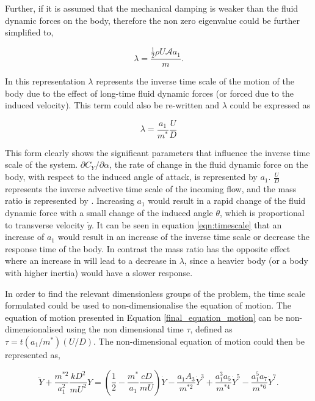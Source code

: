   Further, if it is assumed that the mechanical damping is weaker than the fluid dynamic forces on the body, therefore the non zero eigenvalue could be further simplified to,
  
 \begin{equation}
 \label{eqn:eigs_nospring_nodamp}
 \lambda=\frac{\frac{1}{2}\rho U\mathcal{A}a_1}{m}.
 \end{equation}  

In this representation $\lambda$ represents the inverse time scale of the motion of the body due to the effect of long-time fluid dynamic forces (or forced due to the induced velocity). This term could also be re-written and $\lambda$ could be expressed as 

\begin{equation}
\label{eqn:timescale}
\lambda = \frac{a_1}{m^*}\frac{U}{D}
\end{equation}

This form clearly shows the significant parameters that influence the inverse time scale of the system. $\partial C_Y / \partial \alpha $, the rate of change in the fluid dynamic force on the body, with respect to the induced angle of attack, is represented by $a_1$. $\frac{U}{D}$ represents the inverse advective time scale of the incoming flow, and the mass ratio is represented by \mstar. Increasing $a_1$ would result in a rapid change of the fluid dynamic force with a small change of the induced angle $\theta$, which is proportional to transverse velocity $\dot{y}$. It can be seen in equation \ref{eqn:timescale} that an increase of $a_{1}$ would result in an increase of the inverse time scale or decrease the response time of the body. In contrast the mass ratio has the opposite effect where an increase in \mstar will lead to a decrease in $\lambda$, since a heavier body (or a body with higher inertia) would have a slower response. 

In order to find the relevant dimensionless groups of the problem, the time scale formulated could be used to non-dimensionalise the equation of motion. The equation of motion presented in Equation \ref{final_equation_motion} can be non-dimensionalised using the non dimensional time $\tau$, defined as $\tau=t(a_1/m^*)(U/D)$. The non-dimensional equation of motion could then be represented as, 

 \begin{equation}
 \label{eqn:eom_nondim}
 \ddot{Y} + \frac{m^{*2}}{a_1^2}\frac{kD^2}{mU^2}Y = \left(\frac{1}{2} - \frac{m^*}{a_1}\frac{cD}{mU}\right)\dot{Y} - \frac{a_1A_3}{m^{*2}}\dot{Y}^3 + \frac{a_1^3a_5}{m^{*4}}\dot{Y}^5 - \frac{a_1^5a_7}{m^{*6}}\dot{Y}^7.
 \end{equation}
 
